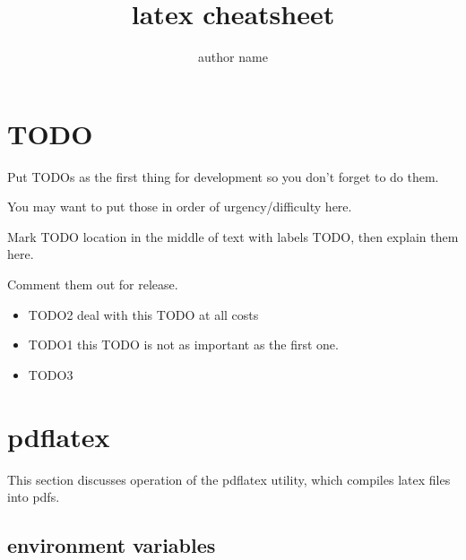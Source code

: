 \documentclass[12pt]{article}
\title{latex cheatsheet}
\author{author name}
\begin{document}
\tableofcontents
\newpage

\section{TODO}

    \begin{remark}
        Put TODOs as the first \label{TODO2} thing for development so you don't forget to do them.

        You may want to put those in order of urgency/difficulty here.

        Mark TODO location in \label{TODO1} the middle of text with labels TODO, then explain them here.

        Comment them out for release.
    \end{remark}

    \begin{itemize}
        \item TODO2 deal with this TODO at all costs
        \item TODO1 this TODO is not as important as the first one.
        \item TODO3
    \end{itemize}

\section{pdflatex}

    This section discusses operation of the pdflatex utility,
    which compiles latex files into pdfs.

    \subsection{environment variables}
\end{document}
